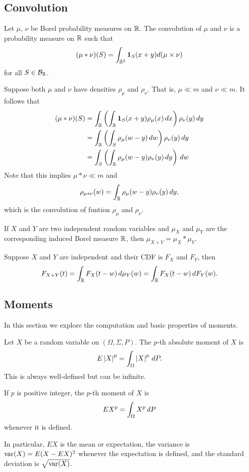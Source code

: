 \documentclass[a4paper]{article}
\begin{document}
\subsection{Convolution}

\begin{defi}[convolution]
  Let $\mu$, $\nu$ be Borel probability measures on $\mathbb{R}$.
  The convolution of $\mu$ and $\nu$ is a probability measure
  on $\mathbb{R}$ such that
  \[
  (\mu * \nu) (S) = \int_{\mathbb{R}^2} \operatorname{\mathbf{1}}_S (x + y) d (\mu \times \nu)
  \]
  for all $S \in \mathcal{B}_{\mathbb{R}}$.
\end{defi}

\begin{remark}
  Suppose both $\mu$ and $\nu$ have densities $\rho_\mu$ and
  $\rho_\nu$. That is,
  $\mu \ll m$ and $\nu \ll m$. It follows that
  \begin{align*}
    (\mu * \nu) (S)
    &= \int_{\mathbb{R}} \left( \int_{\mathbb{R}} \operatorname{\mathbf{1}}_S (x + y) \rho_\mu (x) \, d x \right)
    \rho_\nu (y) \, d y \\
    &= \int_{\mathbb{R}} \left( \int_S \rho_\mu (w - y) \, d w \right) \rho_\nu (y) \, d y \\
    &= \int_S \left( \int_{\mathbb{R}} \rho_\mu (w - y) \rho_\nu (y) \, d y \right)
    \, d w
  \end{align*}
  Note that this implies $\mu * \nu \ll m$ and
  \[
  \rho_{\mu * \nu} (w) = \int_{\mathbb{R}} \rho_\mu (w - y) \rho_\nu (y) \, d y,
  \]
  which is the convolution of funtion $\rho_\mu$ and $\rho_\nu$.
\end{remark}

\begin{remark}
  If $X$ and $Y$ are two independent random variables and
  $\mu_X$ and $\mu_Y$ are the corresponding induced Borel measure $\mathbb{R}$,
  then $\mu_{X + Y} = \mu_X * \mu_Y$.
\end{remark}

\begin{remark}
  Suppose $X$ and $Y$ are independent and their CDF is $F_X$ and $F_Y$,
  then 
  \[
  F_{X + Y} (t) = \int_{\mathbb{R}} F_X (t - w) \, d \mu_Y (w)
  = \int_{\mathbb{R}} F_X (t - w) \, d F_Y (w).
  \]
\end{remark}

\subsection{Moments}

In this section we explore the computation and basic properties of 
moments.

\begin{defi}[moments]
  Let $X$ be a random variable on $(\Omega, \Sigma, P)$. 
  The $p$-th absolute moment of $X$ is 
  \[
  E \left\lvert X\right\rvert^p = \int_\Omega \left\lvert X\right\rvert^p \, d P.
  \]
  This is always well-defined but can be infinite.

  If $p$ is positive integer, the $p$-th moment of $X$ is 
  \[
  E X^p = \int_\Omega X^p \, d P
  \]
  whenever it is defined.

  In particular, $E X$ is the mean or expectation, the variance is 
  $\operatorname{var} (X) = E (X - E X)^2$ whenever the expectation is defined,
  and the standard deviation is $\sqrt{\operatorname{var} (X)}$.
\end{defi}
\end{document}
